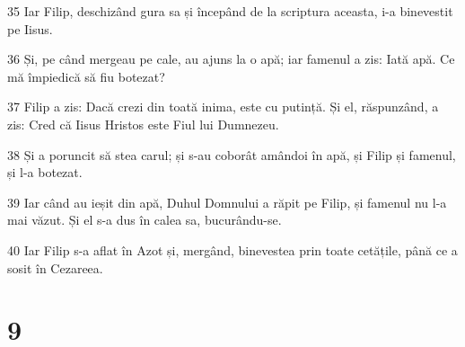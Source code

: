 \par 35 Iar Filip, deschizând gura sa și începând de la scriptura aceasta, i-a binevestit pe Iisus.
\par 36 Și, pe când mergeau pe cale, au ajuns la o apă; iar famenul a zis: Iată apă. Ce mă împiedică să fiu botezat?
\par 37 Filip a zis: Dacă crezi din toată inima, este cu putință. Și el, răspunzând, a zis: Cred că Iisus Hristos este Fiul lui Dumnezeu.
\par 38 Și a poruncit să stea carul; și s-au coborât amândoi în apă, și Filip și famenul, și l-a botezat.
\par 39 Iar când au ieșit din apă, Duhul Domnului a răpit pe Filip, și famenul nu l-a mai văzut. Și el s-a dus în calea sa, bucurându-se.
\par 40 Iar Filip s-a aflat în Azot și, mergând, binevestea prin toate cetățile, până ce a sosit în Cezareea.

\chapter{9}

